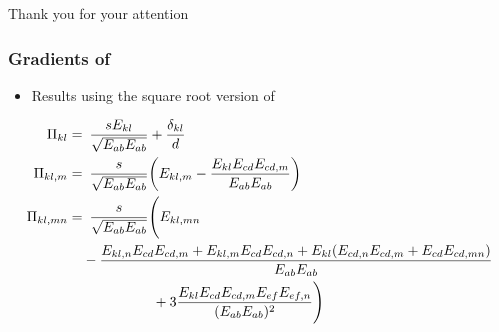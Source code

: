 \documentclass[10pt,mathserif]{beamer}
\begin{document}
\begin{frame}
    \centering
    \Large
    Thank you for your attention
\end{frame}

\begin{frame}
    \frametitle{Gradients of \PP}
    \begin{itemize}
        \item Results using the square root version of \PP
    \end{itemize}
    \begin{align*}
        \Pi_{kl} =&\enspace \frac{s E_{kl}}{\sqrt{E_{ab}E_{ab}}} + \frac{\delta_{kl}}{d} \\
        \Pi_{kl,m} =&\enspace \frac{s}{\sqrt{E_{ab}E_{ab}}} \qty(E_{kl,m} - \frac{E_{kl}E_{cd}E_{cd,m}}{E_{ab}E_{ab}}) \\
        \Pi_{kl,mn} =&\enspace \frac{s}{\sqrt{E_{ab}E_{ab}}} \Biggl(E_{kl,mn} \\ 
        &-\frac{E_{kl,n}E_{cd}E_{cd,m} + E_{kl,m}E_{cd}E_{cd,n} + E_{kl}(E_{cd,n}E_{cd,m} + E_{cd}E_{cd,mn})}{E_{ab}E_{ab}} \\
        &\phantom{\frac{s}{\sqrt{E_{ab}E_{ab}}} \Biggl(} + 3\frac{E_{kl}E_{cd}E_{cd,m}E_{ef}E_{ef,n}}{(E_{ab}E_{ab})^2} \Biggr)
    \end{align*}
\end{frame}
\end{document}
